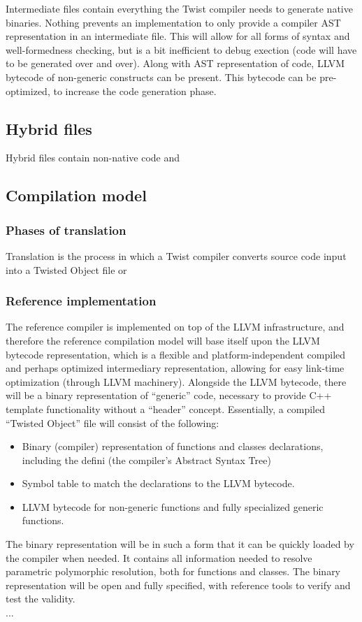 \documentclass[a4paper,11pt]{report}
\begin{document}
Intermediate files contain everything the Twist compiler needs to generate native binaries.
Nothing prevents an implementation to only provide a compiler AST representation in an intermediate file.
This will allow for all forms of syntax and well-formedness checking, but is a bit inefficient to debug exection (code will have to be generated over and over).
Along with AST representation of code, LLVM bytecode of non-generic constructs can be present.
This bytecode can be pre-optimized, to increase the code generation phase. 

  \subsection{Hybrid files}

Hybrid files contain non-native code and 

  \subsection{Compilation model}
    \subsubsection{Phases of translation}

Translation is the process in which a Twist compiler converts source code input into a Twisted Object file or 

    \subsubsection{Reference implementation}

The reference compiler is implemented on top of the LLVM infrastructure, and therefore the reference compilation model will base itself upon the LLVM bytecode representation, which is a flexible and platform-independent compiled and perhaps optimized intermediary representation, allowing for easy link-time optimization (through LLVM machinery).
Alongside the LLVM bytecode, there will be a binary representation of “generic” code, necessary to provide C++ template functionality without a “header” concept.
Essentially, a compiled “Twisted Object” file will consist of the following:
\begin{itemize}
  \item Binary (compiler) representation of functions and classes declarations, including the defini (the compiler’s Abstract Syntax Tree)
  \item Symbol table to match the declarations to the LLVM bytecode.
  \item LLVM bytecode for non-generic functions and fully specialized generic functions.
\end{itemize}
The binary representation will be in such a form that it can be quickly loaded by the compiler when needed.
It contains all information needed to resolve parametric polymorphic resolution, both for functions and classes.
The binary representation will be open and fully specified, with reference tools to verify and test the validity.
\\ ...
\end{document}
